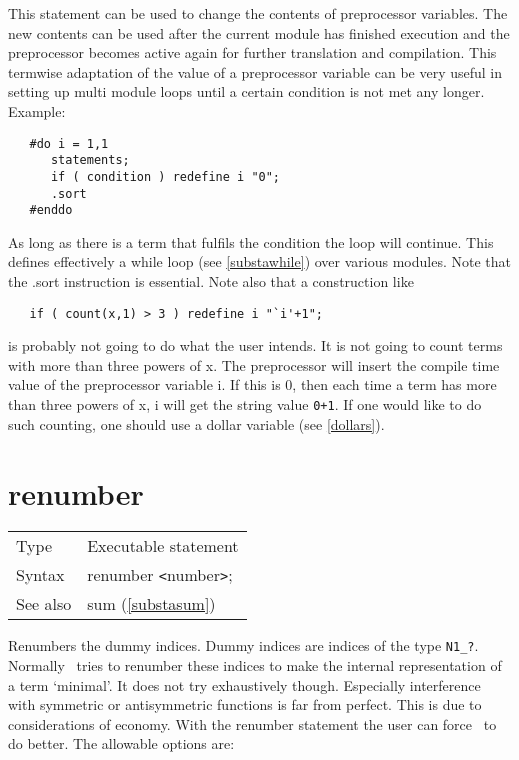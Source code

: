 \noindent This statement can be used to change the contents 
of preprocessor 
variables. The new contents can be used after 
the current module has finished execution and the preprocessor becomes 
active again for further translation and compilation. 
This termwise adaptation of the value of a preprocessor variable can be 
very useful in setting up multi module loops until a certain condition is 
not met any longer. Example:
\begin{verbatim}
   #do i = 1,1
      statements;
      if ( condition ) redefine i "0";
      .sort
   #enddo
\end{verbatim}
As long as there is a term that fulfils the condition the loop 
will continue. This defines effectively a while loop (see 
\ref{substawhile}) over various modules. Note that the .sort 
instruction is essential. Note also that a construction like
\begin{verbatim}
   if ( count(x,1) > 3 ) redefine i "`i'+1";
\end{verbatim}
is probably not going to do what the user intends. It is not going to count 
terms with more than three powers of x. The preprocessor will insert the 
compile time value of the preprocessor variable i. If this is 0, then each 
time a term has more than three powers of x, i will get the string value 
\verb:0+1:. If one would like to do such counting, one should use a 
dollar variable (see \ref{dollars}). \vspace{10mm}


\section{renumber}
\label{substarenumber}

\noindent \begin{tabular}{ll}
Type & Executable statement\\
Syntax & renumber {\tt<}number{\tt>};
\\ See also & sum (\ref{substasum})
\end{tabular}\vspace{4mm}

\noindent Renumbers the dummy 
indices. Dummy indices are indices of the type 
\verb:N1_?:. Normally \FORM\ tries to renumber these indices to make the 
internal representation of a term `minimal'. It does not try exhaustively 
though. Especially interference with symmetric or antisymmetric functions 
is far from perfect. This is due to considerations of economy. With the 
renumber statement the user can force \FORM\ to do better. The allowable 
options are:

